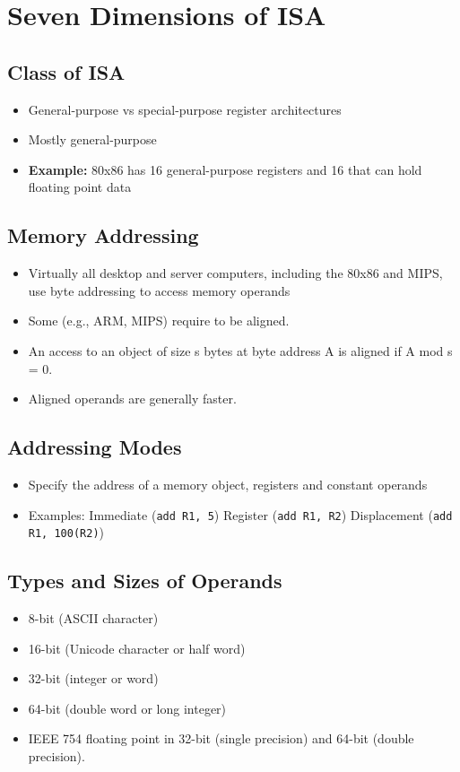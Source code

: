 \documentclass[9pt,twocolumn]{article}
\begin{document}
\section*{Seven Dimensions of ISA}
  \subsection*{Class of ISA}
  \begin{itemize}
    \item General-purpose vs special-purpose register architectures
    \item Mostly general-purpose
    \item \textbf{Example:} 80x86 has 16 general-purpose registers and 16 that can hold floating point data
  \end{itemize}

  \subsection*{Memory Addressing}
  \begin{itemize}
    \item Virtually all desktop and server computers, including the 80x86 and MIPS, use byte addressing to access memory operands
    \item Some (e.g., ARM, MIPS) require to be aligned.
    \item An access to an object of size s bytes at byte address A is aligned if A mod s = 0.
    \item Aligned operands are generally faster.
  \end{itemize}

  \subsection*{Addressing Modes}
  \begin{itemize}
    \item Specify the address of a memory object, registers and constant operands
    \item Examples:
      \subitem Immediate (\texttt{add R1, 5})
      \subitem Register (\texttt{add R1, R2})
      \subitem Displacement (\texttt{add R1, 100(R2)})
  \end{itemize}

  \subsection*{Types and Sizes of Operands}
  \begin{itemize}
    \item 8-bit (ASCII character)
    \item 16-bit (Unicode character or half word)
    \item 32-bit (integer or word)
    \item 64-bit (double word or long integer)
    \item IEEE 754 floating point in 32-bit (single precision) and 64-bit (double precision).
  \end{itemize}
\end{document}
